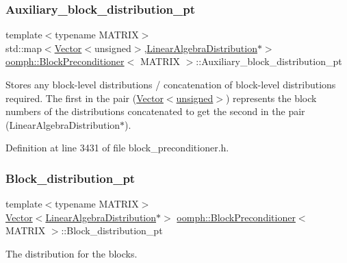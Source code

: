 \subsubsection{\texorpdfstring{Auxiliary\+\_\+block\+\_\+distribution\+\_\+pt}{Auxiliary\_block\_distribution\_pt}}
{\footnotesize\ttfamily template$<$typename M\+A\+T\+R\+IX$>$ \\
std\+::map$<$\hyperlink{classoomph_1_1Vector}{Vector}$<$unsigned$>$,\hyperlink{classoomph_1_1LinearAlgebraDistribution}{Linear\+Algebra\+Distribution}$\ast$$>$ \hyperlink{classoomph_1_1BlockPreconditioner}{oomph\+::\+Block\+Preconditioner}$<$ M\+A\+T\+R\+IX $>$\+::Auxiliary\+\_\+block\+\_\+distribution\+\_\+pt\hspace{0.3cm}{\ttfamily [private]}}



Stores any block-\/level distributions / concatenation of block-\/level distributions required. The first in the pair (\hyperlink{classoomph_1_1Vector}{Vector$<$unsigned$>$}) represents the block numbers of the distributions concatenated to get the second in the pair (Linear\+Algebra\+Distribution$\ast$). 



Definition at line 3431 of file block\+\_\+preconditioner.\+h.

\mbox{\label{classoomph_1_1BlockPreconditioner_a59e83eca59e3cdc41a93668539e138f1}} 
\subsubsection{\texorpdfstring{Block\+\_\+distribution\+\_\+pt}{Block\_distribution\_pt}}
{\footnotesize\ttfamily template$<$typename M\+A\+T\+R\+IX$>$ \\
\hyperlink{classoomph_1_1Vector}{Vector}$<$\hyperlink{classoomph_1_1LinearAlgebraDistribution}{Linear\+Algebra\+Distribution}$\ast$$>$ \hyperlink{classoomph_1_1BlockPreconditioner}{oomph\+::\+Block\+Preconditioner}$<$ M\+A\+T\+R\+IX $>$\+::Block\+\_\+distribution\+\_\+pt\hspace{0.3cm}{\ttfamily [protected]}}



The distribution for the blocks. 



